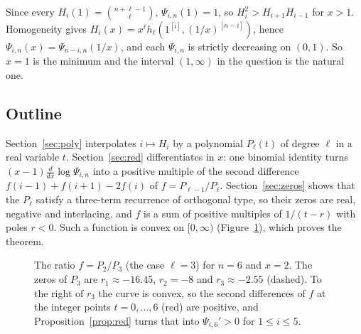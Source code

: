 \documentclass[11pt]{amsart}
\theoremstyle{remark}
\begin{document}
Since every $H_i(1)=\binom{n+\ell-1}{\ell}$, $\Psi_{i,n}(1)=1$, so $H_i^2>H_{i+1}H_{i-1}$ for $x>1$. Homogeneity gives $H_i(x)=x^\ell h_\ell(1^{[i]},(1/x)^{[n-i]})$, hence $\Psi_{i,n}(x)=\Psi_{n-i,n}(1/x)$, and each $\Psi_{i,n}$ is strictly decreasing on $(0,1)$. So $x=1$ is the minimum and the interval $(1,\infty)$ in the question is the natural one.

\subsection*{Outline}
Section~\ref{sec:poly} interpolates $i\mapsto H_i$ by a polynomial $P_\ell(t)$ of degree $\ell$ in a real variable $t$. Section~\ref{sec:red} differentiates in $x$: one binomial identity turns $(x-1)\frac{d}{dx}\log\Psi_{i,n}$ into a positive multiple of the second difference $f(i-1)+f(i+1)-2f(i)$ of $f=P_{\ell-1}/P_\ell$. Section~\ref{sec:zeros} shows that the $P_\ell$ satisfy a three-term recurrence of orthogonal type, so their zeros are real, negative and interlacing, and $f$ is a sum of positive multiples of $1/(t-r)$ with poles $r<0$. Such a function is convex on $[0,\infty)$ (Figure~\ref{fig:f}), which proves the theorem.

\begin{figure}[ht]
\centering
{}
\caption{The ratio $f=P_{2}/P_{3}$ (the case $\ell=3$) for $n=6$ and $x=2$. The zeros of $P_3$ are $r_1\approx-16.45$, $r_2=-8$ and $r_3\approx-2.55$ (dashed). To the right of $r_3$ the curve is convex, so the second differences of $f$ at the integer points $t=0,\dots,6$ (red) are positive, and Proposition~\ref{prop:red} turns that into $\Psi_{i,6}'>0$ for $1\le i\le5$.}
\label{fig:f}
\end{figure}
\end{document}
